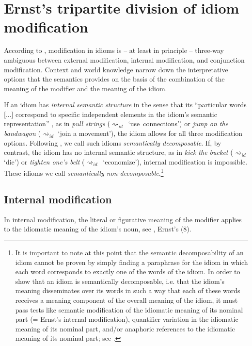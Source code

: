 \documentclass[output=paper]{langsci/langscibook}
\begin{document}
\section{Ernst's tripartite division of idiom modification} \label{Ernst 81}

According to \cite{ernst81}, modification in idioms is -- at least in principle -- three-way ambiguous between external modification, internal modification, and conjunction modification. Context and world knowledge narrow down the interpretative options that the semantics provides on the basis of the combination of the meaning of the modifier and the meaning of the idiom. 
 
If an idiom has \textit{internal semantic structure} in the sense that its ``particular words [...] correspond to specific independent elements in the idiom's semantic representation'' \citep[67]{ernst81}, as in \textit{pull strings} \mbox{($\rightsquigarrow_{id}$ `use connections')} or \textit{jump on the bandwagon} ($\rightsquigarrow_{id}$ `join a movement'), the idiom allows for all three modification options. Following \cite{Nunberg:al:94}, we call such idioms \textit{semantically decomposable}. If, by contrast, the idiom has no internal semantic structure, as in \textit{kick the bucket} ($\rightsquigarrow_{id}$ `die') or \textit{tighten one's belt} \mbox{($\rightsquigarrow_{id}$ `economize')}, internal modification is impossible. These idioms we call \textit{semantically non-decomposable}.\footnote{It is important to note at this point that the semantic decomposability of an idiom cannot be proven by simply finding a paraphrase for the idiom in which each word corresponds to exactly one of the words of the idiom. In order to show that an idiom is semantically decomposable, i.e. that the idiom's meaning disseminates over its words in such a way that each of these words receives a meaning component of the overall meaning of the idiom, it must pass tests like semantic modification of the idiomatic meaning of its nominal part (= Ernst's internal modification), quantifier variation in the idiomatic meaning of its nominal part, and/or anaphoric references to the idiomatic meaning of its nominal part; see \cite{Nunberg:al:94}.}



\subsection{Internal modification} \label{IntMod}

In internal modification, the literal or figurative meaning of the modifier applies to the idiomatic meaning of the idiom's noun, see , Ernst's (8).
\end{document}
